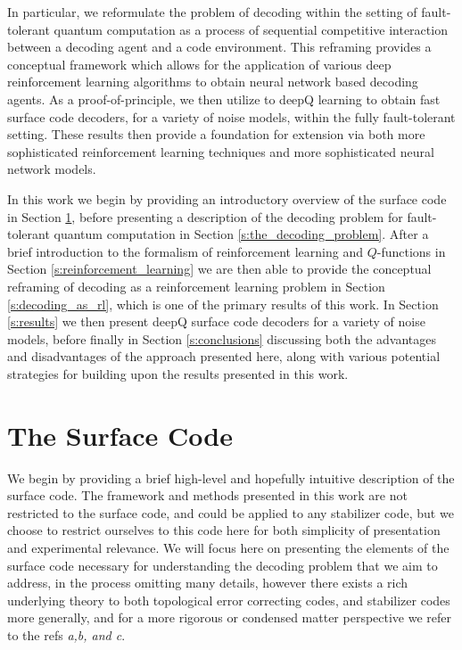 \documentclass[onecolumn,preprintnumbers,amsmath,amssymb,notitlepage,nofootinbib,longbibliography,superscriptaddress,aps,pra,10pt]{revtex4-1}
\begin{document}
	In particular, we reformulate the problem of decoding within the setting of fault-tolerant quantum computation as a process of sequential competitive interaction between a decoding agent and a code environment.
	This reframing provides a conceptual framework which allows for the application of various deep reinforcement learning algorithms to obtain neural network based decoding agents.
	As a proof-of-principle, we then utilize to deepQ learning to obtain fast surface code decoders, for a variety of noise models, within the fully fault-tolerant setting.
	These results then provide a foundation for extension via both more sophisticated reinforcement learning techniques and more sophisticated neural network models.

	In this work we begin by providing an introductory overview of the surface code in Section \ref{s:the_surface_code}, before presenting a description of the decoding problem for fault-tolerant quantum computation in Section \ref{s:the_decoding_problem}.
	After a brief introduction to the formalism of reinforcement learning and $Q$-functions in Section \ref{s:reinforcement_learning} we are then able to provide the conceptual reframing of decoding as a reinforcement learning problem in Section \ref{s:decoding_as_rl}, which is one of the primary results of this work.
	In Section \ref{s:results} we then present deepQ surface code decoders for a variety of noise models, before finally in Section \ref{s:conclusions} discussing both the advantages and disadvantages of the approach presented here, along with various potential strategies for building upon the results presented in this work.



\section{The Surface Code}\label{s:the_surface_code}


    We begin by providing a brief high-level and hopefully intuitive description of the surface code. The framework and methods presented in this work are not restricted to the surface code, and could be applied to any stabilizer code, but we choose to restrict ourselves to this code here for both simplicity of presentation and experimental relevance. We will focus here on presenting the elements of the surface code necessary for understanding the decoding problem that we aim to address, in the process omitting many details, however there exists a rich underlying theory to both topological error correcting codes, and stabilizer codes more generally, and for a more rigorous or condensed matter perspective we refer to the refs \textit{a,b, and c}.
\end{document}
